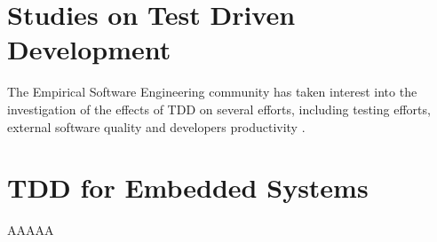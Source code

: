 \section{Studies on Test Driven Development}
The Empirical Software Engineering community has taken interest into the investigation of the effects of TDD on several efforts, including testing efforts, external software quality and developers productivity \cite{DBLP:conf/esem/FucciS0SSUTJO16}.



\section{TDD for Embedded Systems}
AAAAA